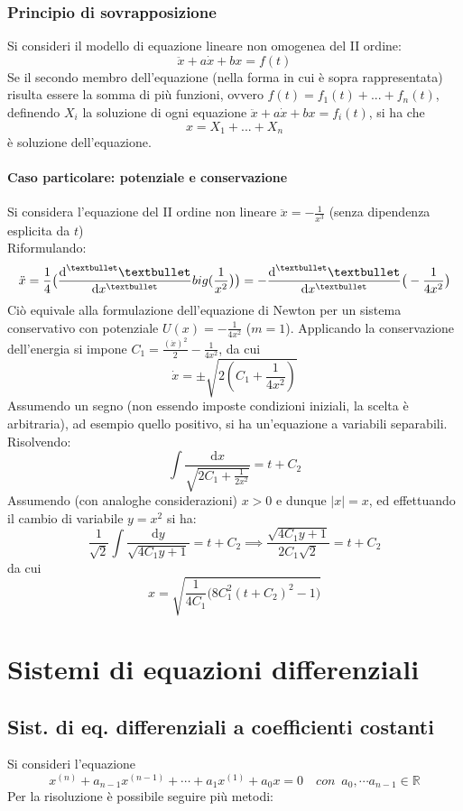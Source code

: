 \documentclass[10pt, oneside]{book}
\theoremstyle{plain}
\begin{document}
\subsection{Principio di sovrapposizione}
Si consideri il modello di equazione lineare non omogenea del II ordine:
\[\ddot x + a \dot x + b x = f(t)\]
Se il secondo membro dell'equazione (nella forma in cui è sopra rappresentata) risulta essere la somma di più funzioni, ovvero $f(t) = f_1(t) + ... + f_n(t)$, definendo $X_i$ la soluzione di ogni equazione $\ddot x + a \dot x + b x = f_i(t)$, si ha che
\[x = X_1 + ... + X_n\]
è soluzione dell'equazione. 

\subsubsection{Caso particolare: potenziale e conservazione}
Si considera l'equazione del II ordine non lineare $\displaystyle \ddot x = - \frac{1}{x^3}$ (senza dipendenza esplicita da $t$)
\\Riformulando:
\[\ddot x = \frac{1}{4}\big(\frac{\textrm{d}^{•} •}{\textrm{d}x^{•}}\\big(\frac{1}{x^2}\big)\big)= -\frac{\textrm{d}^{•} •}{\textrm{d}x^{•}}\big(-\frac{1}{4x^2}\big)\]
Ciò equivale alla formulazione dell'equazione di Newton per un sistema conservativo con potenziale $\displaystyle U(x) = - \frac{1}{4x^2}$ ($m=1$). Applicando la conservazione dell'energia si impone $\displaystyle C_1 = \frac{(\dot x)^2}{2} - \frac{1}{4x^2}$, da cui
\[\dot x = \pm \sqrt{2(C_1 + \frac{1}{4x^2})}\]
Assumendo un segno (non essendo imposte condizioni iniziali, la scelta è arbitraria), ad esempio quello positivo, si ha un'equazione a variabili separabili. Risolvendo:
\[\int \frac{\textrm{d}x}{\sqrt{2C_1 + \frac{1}{2x^2}}} = t + C_2\]
Assumendo (con analoghe considerazioni) $x>0$ e dunque $|x| = x$, ed effettuando il cambio di variabile $y = x^2$ si ha:
\[\frac{1}{\sqrt{2}}\int \frac{\textrm{d}y}{\sqrt{4C_1y + 1}} = t + C_2 \implies \frac{\sqrt{4C_1 y + 1}}{2C_1 \sqrt{2}} = t + C_2\]
da cui 
\[x = \sqrt{\frac{1}{4C_1} \big(8C_1^2 (t + C_2)^2 - 1\big)}\]

\chapter{Sistemi di equazioni differenziali}
\section{Sist. di eq. differenziali a coefficienti costanti}
Si consideri l'equazione
\[x^{(n)} + a_{n-1}x^{(n-1)} + \cdots + a_1x^{(1)} + a_0 x = 0 \quad con \enspace a_0, \cdots a_{n-1} \in \mathbb{R}\]
Per la risoluzione è possibile seguire più metodi:
\end{document}
